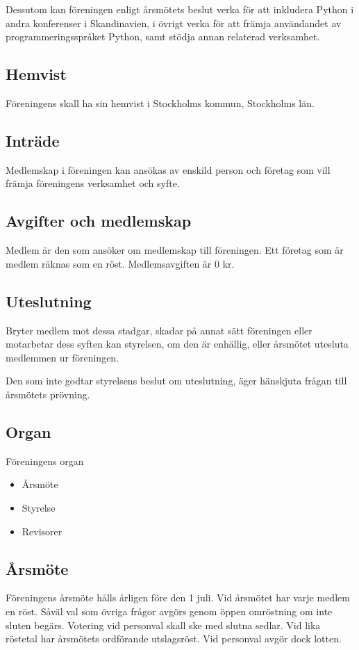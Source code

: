 \documentclass[11pt, a4paper]{article}
\begin{document}
Dessutom kan föreningen enligt årsmötets beslut verka för att inkludera Python i andra konferenser i Skandinavien, i övrigt verka för att främja användandet av programmeringsspråket Python, samt stödja annan relaterad verksamhet.

\subsection{Hemvist}
Föreningens skall ha sin hemvist i Stockholms kommun, Stockholms län.

\subsection{Inträde}
Medlemskap i föreningen kan ansökas av enskild person och företag som vill främja föreningens verksamhet och syfte.

\subsection{Avgifter och medlemskap}
Medlem är den som ansöker om medlemskap till föreningen. Ett företag som är medlem räknas som en röst. Medlemsavgiften är 0 kr.

\subsection{Uteslutning}
Bryter medlem mot dessa stadgar, skadar på annat sätt föreningen eller motarbetar dess syften kan styrelsen, om den är enhällig, eller årsmötet utesluta medlemmen ur föreningen.

Den som inte godtar styrelsens beslut om uteslutning, äger hänskjuta frågan till årsmötets prövning.

\subsection{Organ}
Föreningens organ

\begin{itemize}
    \item Årsmöte
    \item Styrelse
    \item Revisorer
\end{itemize}

\subsection{Årsmöte}
Föreningens årsmöte hålls årligen före den 1 juli. Vid årsmötet har varje medlem en röst. Såväl val som övriga frågor avgörs genom öppen omröstning om inte sluten begärs. Votering vid personval skall ske med slutna sedlar. Vid lika röstetal har årsmötets ordförande utslagsröst. Vid personval avgör dock lotten.
\end{document}
